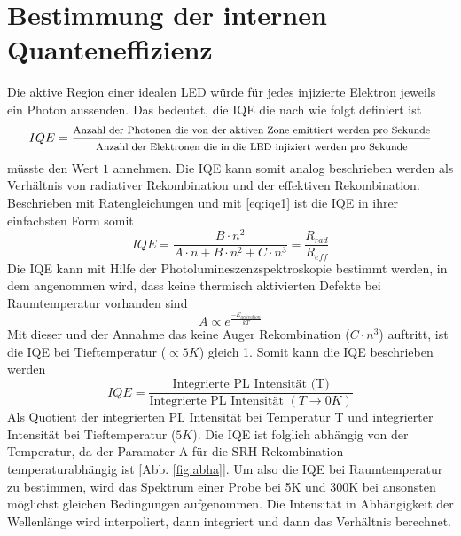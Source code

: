 
\section{Bestimmung der internen Quanteneffizienz}


Die aktive Region einer idealen LED würde für jedes injizierte Elektron jeweils ein Photon aussenden. 
Das bedeutet, die IQE die nach \cite{schub} wie folgt definiert ist
\begin{equation}
    IQE = \frac{ \footnotesize \text{Anzahl der Photonen die von der aktiven Zone emittiert werden pro Sekunde}}{ \footnotesize \text{Anzahl der Elektronen die in die LED injiziert werden pro Sekunde}}
\end{equation}
müsste den Wert $1$ annehmen. Die IQE kann somit analog beschrieben werden als Verhältnis von radiativer Rekombination und der effektiven Rekombination. Beschrieben mit Ratengleichungen und mit \ref{eq:iqe1} ist die IQE in ihrer einfachsten Form somit
\begin{equation}
    IQE = \frac{B \cdot n^2}{A \cdot n + B \cdot n^2 + C \cdot n^3} = \frac{R_{rad}}{R_{eff}}
\end{equation}
Die IQE kann mit Hilfe der Photolumineszenzspektroskopie bestimmt werden, in dem angenommen wird, dass keine thermisch aktivierten Defekte bei Raumtemperatur vorhanden sind
\begin{equation}
    A \propto e^{\frac{-E_{activation}}{kT}}
\end{equation}
Mit dieser und der Annahme das keine Auger Rekombination ($ C \cdot n^3 $) auftritt, ist die IQE bei Tieftemperatur ($ \propto 5K$) gleich 1. Somit kann die IQE beschrieben werden
\begin{equation}
    IQE = \frac{\text{Integrierte PL Intensität (T)}}{ \text{Integrierte PL Intensität } (T \rightarrow 0 K) }
\end{equation}
Als Quotient der integrierten PL Intensität bei Temperatur T und integrierter Intensität bei Tieftemperatur ($5K$). Die IQE ist folglich abhängig von der Temperatur, da der Paramater A für die SRH-Rekombination temperaturabhängig ist [Abb. \ref{fig:abha}]. 
Um also die IQE bei Raumtemperatur zu bestimmen, wird das Spektrum einer Probe bei 5K und 300K bei ansonsten möglichst gleichen Bedingungen aufgenommen. Die Intensität in Abhängigkeit der Wellenlänge wird interpoliert, dann integriert und dann das Verhältnis berechnet. 
%
